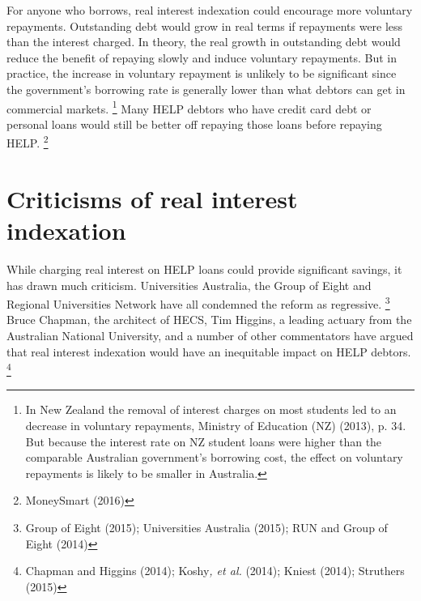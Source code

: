 \documentclass[embargoed]{grattan}
\begin{document}
For anyone who borrows, real interest indexation could encourage more voluntary repayments.
Outstanding debt would grow in real terms if repayments were less than the interest charged.
In theory, the real growth in outstanding debt would reduce the benefit of repaying slowly and induce voluntary repayments.
But in practice, the increase in voluntary repayment is unlikely to be significant since the government's borrowing rate is generally lower than what debtors can get in commercial markets.%
\footnote{In New Zealand the removal of interest charges on most students led to an decrease in voluntary repayments, Ministry of Education (NZ) (2013), p. 34.
But because the interest rate on NZ student loans were higher than the comparable Australian government's borrowing cost, the effect on voluntary repayments is likely to be smaller in Australia.} Many \gls{HELP} debtors who have credit card debt or personal loans would still be better off repaying those loans before repaying \gls{HELP}.%
\footnote{MoneySmart (2016)}

\section{\texorpdfstring{\protect\hypertarget{_Ref438047461}{}{\protect\hypertarget{_Ref333580055}{}{}}Criticisms of real interest indexation}{Criticisms of real interest indexation}}\label{criticisms-of-real-interest-indexation}

While charging real interest on \gls{HELP} loans could provide significant savings, it has drawn much criticism.
Universities Australia, the Group of Eight and Regional Universities Network have all condemned the reform as regressive.%
\footnote{Group of Eight (2015); Universities Australia (2015); RUN and Group of Eight (2014)} Bruce Chapman, the architect of \gls{HECS}, Tim Higgins, a leading actuary from the Australian National University, and a number of other commentators have argued that real interest indexation would have an inequitable impact on \gls{HELP} debtors.%
\footnote{Chapman and Higgins (2014); Koshy\emph{, et al.} (2014); Kniest (2014); Struthers (2015)}
\end{document}
